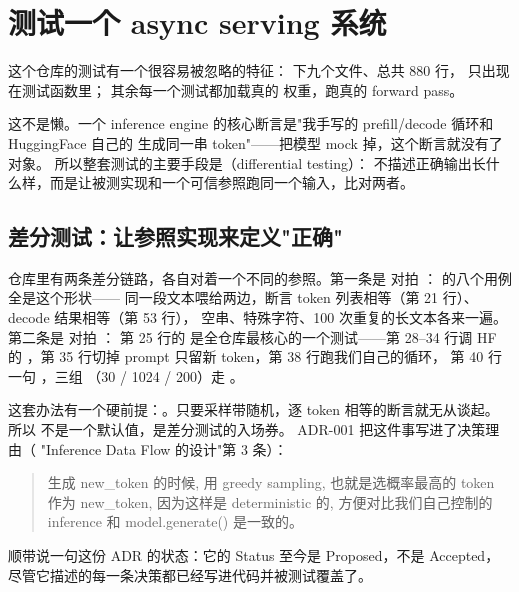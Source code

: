 \section{测试一个 async serving 系统}
\label{sec:a-testing}

这个仓库的测试有一个很容易被忽略的特征：
 下九个文件、总共 880 行， 只出现在测试函数里；
其余每一个测试都加载真的  权重，跑真的 forward pass。

这不是懒。一个 inference engine 的核心断言是"我手写的 prefill/decode 循环和 HuggingFace 自己的
 生成同一串 token"——把模型 mock 掉，这个断言就没有了对象。
所以整套测试的主要手段是（differential testing）：
不描述正确输出长什么样，而是让被测实现和一个可信参照跑同一个输入，比对两者。

\subsection{差分测试：让参照实现来定义"正确"}
\label{sec:test-diff}

仓库里有两条差分链路，各自对着一个不同的参照。第一条是  对拍
： 的八个用例全是这个形状——
同一段文本喂给两边，断言 token 列表相等（第 21 行）、decode 结果相等（第 53 行），
空串、特殊字符、100 次重复的长文本各来一遍。第二条是  对拍
： 第 25 行的
 是全仓库最核心的一个测试——第 28--34 行调 HF 的
，第 35 行切掉 prompt 只留新 token，第 38 行跑我们自己的循环，
第 40 行一句 ，三组 
（30 / 1024 / 200）走 。

这套办法有一个硬前提：。只要采样带随机，逐 token 相等的断言就无从谈起。
所以  不是一个默认值，是差分测试的入场券。
ADR-001 把这件事写进了决策理由（ "Inference Data Flow 的设计"第 3 条）：

\begin{quote}
生成 new\_token 的时候, 用 greedy sampling, 也就是选概率最高的 token 作为 new\_token,
因为这样是 deterministic 的, 方便对比我们自己控制的 inference 和 model.generate() 是一致的。
\end{quote}

顺带说一句这份 ADR 的状态：它的 Status 至今是 Proposed，不是 Accepted，
尽管它描述的每一条决策都已经写进代码并被测试覆盖了。

